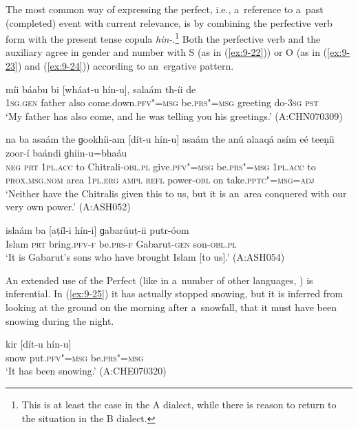 The most common way of expressing the perfect, i.e., a~reference to a~past (completed) event with current relevance, is by combining the perfective verb form with the present tense copula \textit{hin-}.\footnote{This is at least the case in the A dialect, while there is reason to return to the situation in the B dialect.} Both the perfective verb and the auxiliary agree in gender and number with S (as in (\ref{ex:9-22})) or O (as in (\ref{ex:9-23}) and (\ref{ex:9-24})) according to an~ergative pattern.

\begin{exe}
\ex
\label{ex:9-22}
\gll míi báabu bi [wháat-u hín-u], salaám th-íi de \\
\textsc{1sg.gen} father also come.down.\textsc{pfv"=msg} be.\textsc{prs"=msg} greeting do-\textsc{3sg} \textsc{pst} \\
\glt `My father has also come, and he was telling you his greetings.' (A:CHN070309)

\ex
\label{ex:9-23}
\gll na ba asaám the ɡookhíi-am [dít-u hín-u] asaám the anú alaaqá asím eé teeṇíi zoor-í baándi ɡhiin-u=bhaáu \\
\textsc{neg} \textsc{prt} \textsc{1pl.acc} to Chitrali-\textsc{obl.pl} give.\textsc{pfv"=msg}  be.\textsc{prs"=msg } \textsc{1pl.acc} to \textsc{prox.msg.nom} area  \textsc{1pl.erg} \textsc{ampl} \textsc{refl} power-\textsc{obl} on take.\textsc{pptc"=msg=adj} \\
\glt `Neither have the Chitralis given this to us, but it is an~area conquered with our very own power.' (A:ASH052)

\ex
\label{ex:9-24}
\gll islaám ba [aṭíl-i hín-i] ɡabarúuṭ-ii putr-óom \\
Islam \textsc{prt} bring.\textsc{pfv-f} be.\textsc{prs-f} Gabarut-\textsc{gen} son-\textsc{obl.pl} \\
\glt `It is Gabarut's sons who have brought Islam [to us].' (A:ASH054) 
\end{exe}

An extended use of the Perfect (like in a~number of other languages, \citealt[152]{dahl1985}) is inferential. In (\ref{ex:9-25}) it has actually stopped snowing, but it is inferred from looking at the ground on the morning after a~snowfall, that it must have been snowing during the night.

\begin{exe}
\ex
\label{ex:9-25}
\gll kir [dít-u hín-u] \\
snow put.\textsc{pfv"=msg} be.\textsc{prs"=msg} \\
\glt `It has been snowing.' (A:CHE070320)
\end{exe}


